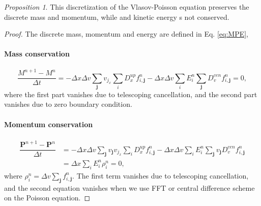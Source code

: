 \documentclass[preprint,1p,times]{elsarticle}
\theoremstyle{definition}
\theoremstyle{remark}
\newtheorem{proposition}{Proposition}
\begin{document}
\begin{proposition}
    This discretization of the Vlasov-Poisson equation preserves the discrete mass and momentum, while and kinetic energy s not conserved.
\end{proposition}
\begin{proof}
The discrete mass, momentum and energy are defined in Eq. \eqref{eq:MPE},


\paragraph{Mass conservation}

\begin{equation}
    \dfrac{M^{n+1}-M^n}{\Delta t} = - \Delta x \Delta v \sum_{\bm{j}} v_{j_{x}} \sum_{i} D_{x}^{up} f_{i,\bm{j}}^{n} - \Delta x \Delta v \sum_{i} E_{i}^{n} \sum_{\bm{j}} D_{v}^{cen} f_{i,\bm{j}}^{n} = 0 ,
\end{equation}
where the first part vanishes due to telescoping cancellation, and the second part vanishes due to zero boundary condition.


\paragraph{Momentum conservation}

\begin{equation}
\begin{aligned}
    \dfrac{\bm P^{n+1}-\bm P^n}{\Delta t} &= - \Delta x \Delta v \sum_{\bm{j}} v_{\bm{j}} v_{j_{x}} \sum_{i} D_{x}^{up} f_{i,\bm{j}}^{n} - \Delta x \Delta v \sum_{i} E_{i}^{n} \sum_{\bm{j}} v_{\bm{j}} D_{v}^{cen} f_{i,\bm{j}}^{n} \\
    &= \Delta x \sum_{i} E_{i}^{n} \rho_{i}^{n} = 0 ,
\end{aligned}
\end{equation}
where $\rho_{i}^{n} = \Delta v \sum_{\bm{j}} f_{i,\bm{j}}^{n}$.
The first term vanishes due to telescoping cancellation, and the second equation vanishes when we use FFT or central difference scheme on the Poisson equation.



\end{proof}
\end{document}
